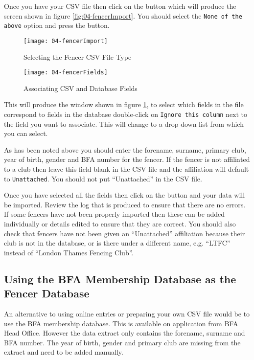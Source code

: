 \documentclass[a4paper,11pt]{memoir}
\begin{document}
Once you have your CSV file then click on the  button which will produce the screen shown in figure \ref{fig:04-fencerImport}. You should select the \texttt{None of the above} option and press the  button.

\begin{figure}[!ht]
 \centering 
 \begin{minipage}{0.4\textwidth}
  \centering
  \texttt{[image: 04-fencerImport]}
  \caption{Selecting the Fencer CSV File Type} \label{fig:04-fencerImport}
 \end{minipage}
 \hfill
 \begin{minipage}{0.4\textwidth}
  \centering
  \texttt{[image: 04-fencerFields]}
  \caption{Associating CSV and Database Fields} \label{fig:04-fencerFields}
 \end{minipage}
\end{figure}

This will produce the window shown in figure \ref{fig:04-fencerFields}, to select which fields in the file correspond to fields in the \fencingtime{} database double-click on \texttt{Ignore this column} next to the field you want to associate. This will change to a drop down list from which you can select.  

As has been noted above you should enter the forename, surname, primary club, year of birth, gender and BFA number for the fencer. If the fencer is not affiliated to a club then leave this field blank in the CSV file and the affiliation will default to \texttt{Unattached}.  You should not put ``Unattached'' in the CSV file. 

Once you have selected all the fields then click on the  button and your data will be imported. Review the log that is produced to ensure that there are no errors. If some fencers have not been properly imported then these can be added individually or details edited to ensure that they are correct. You should also check that fencers have not been given an ``Unattached'' affiliation because their club is not in the database, or is there under a different name, e.g. ``LTFC'' instead of ``London Thames Fencing Club''. 

\subsection{Using the BFA Membership Database as the Fencer Database}

An alternative to using online entries or preparing your own CSV file would be to use the BFA membership database. This is available on application from BFA Head Office. However the data extract only contains the forename, surname and BFA number. The year of birth, gender and primary club are missing from the extract and need to be added manually.
\end{document}
